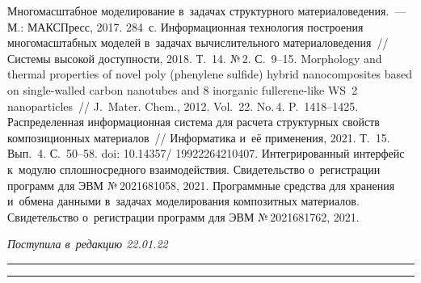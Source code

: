 \begin{multicols}{2}
{{\begin{thebibliography}{9}
    Многомасштабное моделирование в~задачах структурного 
материаловедения.~--- М.: МАКСПресс, 2017. 284~с.
 Информационная технология по\-стро\-ения многомасштабных моделей 
в~задачах вы\-чис\-ли\-тель\-но\-го материаловедения~// Сис\-те\-мы высокой до\-ступ\-ности, 2018. Т.~14. 
№\,2. С.~9--15.
 Morphology and thermal properties of novel poly (phenylene sulfide) 
hybrid nanocomposites based on single-walled carbon nanotubes and 8 inorganic fullerene-like WS~2 
nanoparticles~// J.~Mater. Chem., 2012. Vol.~22. No.\,4. P.~1418--1425.
 Распределенная информационная сис\-те\-ма для расчета 
структурных свойств композиционных материалов~// Информатика и~её применения, 2021. 
Т.~15. Вып.~4. С.~50--58. doi: 10.14357/ 19922264210407.
 Интегрированный интерфейс к~модулю сплош\-но\-сред\-но\-го взаимодействия. 
Свидетельство о~регистрации программ для ЭВМ №\,2021681058, 2021.
 Программные средства для хранения и~обмена данными в~задачах 
моделирования композитных материалов. Свидетельство о~регистрации программ для ЭВМ 
№\,2021681762, 2021.

\end{thebibliography}

 }
 }

\end{multicols}

\vspace*{-8pt}

\hfill{\small\textit{Поступила в~редакцию 22.01.22}}

\vspace*{8pt}




\hrule

\vspace*{2pt}

\hrule


\def\tit{SOFTWARE PACKAGE FOR MULTISCALE MODELING OF~STRUCTURAL PROPERTIES 
OF~COMPOSITE MATERIALS}


\def\titkol{Software package for multiscale modeling of~structural properties 
of~composite materials}


